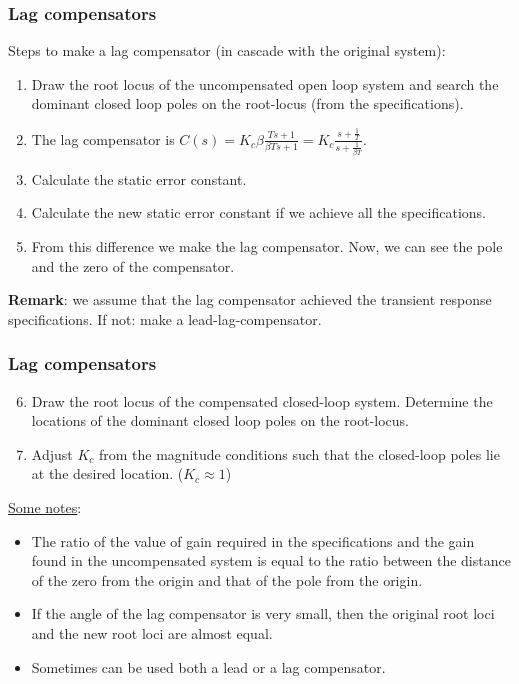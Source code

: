 \begin{frame}
	\frametitle{Lag compensators}
		Steps to make a lag compensator (in cascade with the original system):
		\begin{enumerate}
			\item Draw the root locus of the uncompensated open loop system and search the dominant closed loop poles on the root-locus (from the specifications).
			\item The lag compensator is $C(s)=K_c \beta\frac{Ts+1}{\beta Ts+1}= K_c\frac{s+\frac{1}{T}}{s+\frac{1}{\beta T}}$.
			\item Calculate the static error constant. 
			\item Calculate the new static error constant if we achieve all the specifications.
			\item From this difference we make the lag compensator. Now, we can see the pole and the zero of the compensator. 
		\end{enumerate}
		\textbf{Remark}: we assume that the lag compensator achieved the transient response specifications. If not: make a lead-lag-compensator.
\end{frame}

\begin{frame}
	\frametitle{Lag compensators}
		\begin{enumerate}
			\setcounter{enumi}{5}
			\item Draw the root locus of the compensated closed-loop system. Determine the locations of the dominant closed loop poles on the root-locus. 
			\item Adjust $K_c$ from the magnitude conditions such that the closed-loop poles lie at the desired location. ($K_c\approx 1$)
		\end{enumerate}
		\vspace{3mm}
		
		\underline{Some notes}:
		\begin{itemize}
			\item The ratio of the value of gain required in the specifications and the gain found in the uncompensated system is equal to the ratio between the distance of the zero from the origin and that of the pole from the origin.
			\item If the angle of the lag compensator is very small, then the original root loci and the new root loci are almost equal.
			\item Sometimes can be used both a lead or a lag compensator. 
		\end{itemize}
\end{frame}

